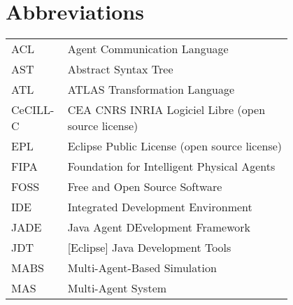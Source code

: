 \chapter*{Abbreviations}

\begin{flushleft}
\begin{tabular}{l p{0.8\linewidth}}
ACL		 & Agent Communication Language \\
AST		 & Abstract Syntax Tree \\
ATL		 & ATLAS Transformation Language \\
CeCILL-C	& CEA CNRS INRIA Logiciel Libre (open source license) \\
EPL		 & Eclipse Public License (open source license) \\
FIPA	 & Foundation for Intelligent Physical Agents \\
FOSS 	 & Free and Open Source Software \\
IDE 	 & Integrated Development Environment \\
JADE	 & Java Agent DEvelopment Framework \\
JDT		 & [Eclipse] Java Development Tools \\
MABS	 & Multi-Agent-Based Simulation \\
MAS      & Multi-Agent System \\

\end{tabular}
\end{flushleft}

